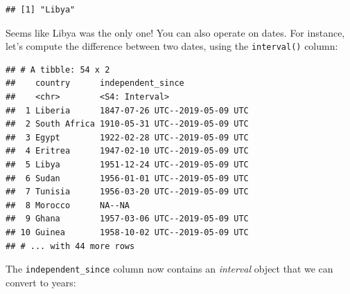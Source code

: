 \documentclass[]{gitbook}
\newenvironment{Shaded}{\begin{snugshade}}{\end{snugshade}}
\newcommand{\DataTypeTok}[1]{\textcolor[rgb]{0.13,0.29,0.53}{#1}}
\newcommand{\KeywordTok}[1]{\textcolor[rgb]{0.13,0.29,0.53}{\textbf{#1}}}
\newcommand{\NormalTok}[1]{#1}
\newcommand{\OperatorTok}[1]{\textcolor[rgb]{0.81,0.36,0.00}{\textbf{#1}}}
\newcommand{\StringTok}[1]{\textcolor[rgb]{0.31,0.60,0.02}{#1}}
\begin{document}
\begin{verbatim}
## [1] "Libya"
\end{verbatim}

Seems like Libya was the only one! You can also operate on dates. For instance, let's compute the difference between
two dates, using the \texttt{interval()} column:

\begin{Shaded}
\end{Shaded}

\begin{verbatim}
## # A tibble: 54 x 2
##    country      independent_since             
##    <chr>        <S4: Interval>                
##  1 Liberia      1847-07-26 UTC--2019-05-09 UTC
##  2 South Africa 1910-05-31 UTC--2019-05-09 UTC
##  3 Egypt        1922-02-28 UTC--2019-05-09 UTC
##  4 Eritrea      1947-02-10 UTC--2019-05-09 UTC
##  5 Libya        1951-12-24 UTC--2019-05-09 UTC
##  6 Sudan        1956-01-01 UTC--2019-05-09 UTC
##  7 Tunisia      1956-03-20 UTC--2019-05-09 UTC
##  8 Morocco      NA--NA                        
##  9 Ghana        1957-03-06 UTC--2019-05-09 UTC
## 10 Guinea       1958-10-02 UTC--2019-05-09 UTC
## # ... with 44 more rows
\end{verbatim}

The \texttt{independent\_since} column now contains an \emph{interval} object that we can convert to years:

\begin{Shaded}
\end{Shaded}
\end{document}
